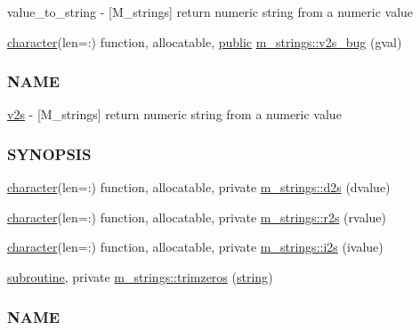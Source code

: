 \begin{DoxyCompactItemize}
\begin{DoxyCompactList}
value\+\_\+to\+\_\+string -\/ \mbox{[}M\+\_\+strings\mbox{]} return numeric string from a numeric value \end{DoxyCompactList}\item 
\hyperlink{option__stopwatch_83_8txt_abd4b21fbbd175834027b5224bfe97e66}{character}(len=\+:) function, allocatable, \hyperlink{M__stopwatch_83_8txt_a2f74811300c361e53b430611a7d1769f}{public} \hyperlink{namespacem__strings_a76a00e3ca7fb7c9b9cadcd484c6e3946}{m\+\_\+strings\+::v2s\+\_\+bug} (gval)
\begin{DoxyCompactList}\small\item\em \subsubsection*{N\+A\+ME}

\hyperlink{interfacem__strings_1_1v2s}{v2s} -\/ \mbox{[}M\+\_\+strings\mbox{]} return numeric string from a numeric value \subsubsection*{S\+Y\+N\+O\+P\+S\+IS}\end{DoxyCompactList}\item 
\hyperlink{option__stopwatch_83_8txt_abd4b21fbbd175834027b5224bfe97e66}{character}(len=\+:) function, allocatable, private \hyperlink{namespacem__strings_ae4fac72ec3065d73aa06a107e41004b7}{m\+\_\+strings\+::d2s} (dvalue)
\item 
\hyperlink{option__stopwatch_83_8txt_abd4b21fbbd175834027b5224bfe97e66}{character}(len=\+:) function, allocatable, private \hyperlink{namespacem__strings_a5adef1b5667afe21e0ee21cfdba13b45}{m\+\_\+strings\+::r2s} (rvalue)
\item 
\hyperlink{option__stopwatch_83_8txt_abd4b21fbbd175834027b5224bfe97e66}{character}(len=\+:) function, allocatable, private \hyperlink{namespacem__strings_a83cecfcd4582760bf2b1e12364c29443}{m\+\_\+strings\+::i2s} (ivalue)
\item 
\hyperlink{M__stopwatch_83_8txt_acfbcff50169d691ff02d4a123ed70482}{subroutine}, private \hyperlink{namespacem__strings_a956638e87e83520f170ccefefac6722b}{m\+\_\+strings\+::trimzeros} (\hyperlink{what__overview_81_8txt_a74cb7e955273b9f9157b4f0c18a38849}{string})
\begin{DoxyCompactList}\small\item\em \subsubsection*{N\+A\+ME}


\end{DoxyCompactList}
\end{DoxyCompactItemize}
